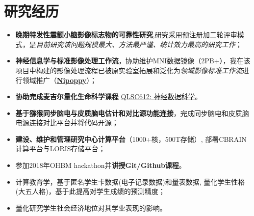 \documentclass{resume}
\begin{document}
\section{研究经历}
\begin{itemize}
  \item \textbf{晚期特发性震颤小脑影像标志物的可靠性研究},研究采用预注册加二轮评审模式，是\emph{目前研究该问题规模最大、方法最严谨、统计效力最高的研究工作}；
  \item \textbf{神经信息学与标准影像处理工作流}，协助维护MNI数据镜像（2PB+），我在该项目中构建的影像处理流程已被原实验室拓展和泛化为\emph{领域影像标准工作流}进行领域推广（\href{https://github.com/neurodatascience/nipoppy}{\bf{Nipoppy}}）； 
  \item \textbf{协助完成麦吉尔量化生命科学课程} \href{https://neurodatascience.github.io/QLS612-Overview/}{QLSC612: 神经数据科学}。
\end{itemize}

\begin{itemize}
  \item \textbf{基于猕猴同步脑电与皮质脑电估计和对比源功能连接}，完成同步脑电和皮质脑电源连接对比平台并将代码开源；
  \item \textbf{建设、维护和管理研究中心计算平台}（1000+核，500T存储）, 部署CBRAIN计算平台与LORIS存储平台； 
  \item 参加2018年OHBM hackathon并\textbf{讲授Git/Github课程}。
\end{itemize}

\begin{itemize}
  \item 计算教育学，基于匿名学生卡数据(电子记录数据)和量表数据, 量化学生性格(大五人格)，基于此提高对学生成绩的预测精度；
  \item 量化研究学生社会经济地位对其学业表现的影响。
\end{itemize}
\end{document}
